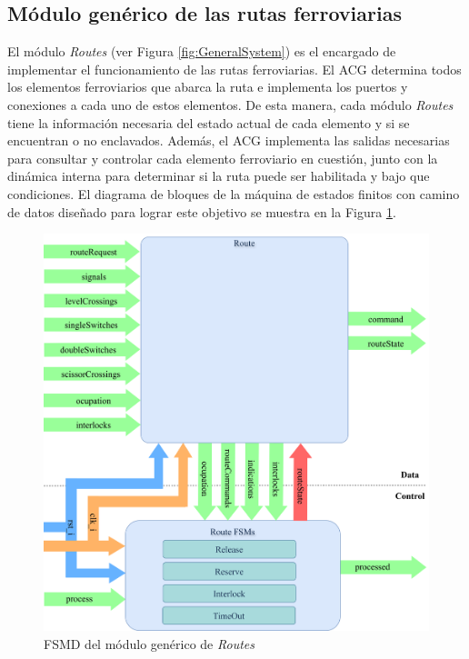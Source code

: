\subsection{Módulo genérico de las rutas ferroviarias}
	\label{sec:ACG_rts}
	
	El módulo \textit{Routes} (ver Figura \ref{fig:GeneralSystem}) es el encargado de implementar el funcionamiento de las rutas ferroviarias. El ACG determina todos los elementos ferroviarios que abarca la ruta e implementa los puertos y conexiones a cada uno de estos elementos. De esta manera, cada módulo \textit{Routes} tiene la información necesaria del estado actual de cada elemento y si se encuentran o no enclavados. Además, el ACG implementa las salidas necesarias para consultar y controlar cada elemento ferroviario en cuestión, junto con la dinámica interna para determinar si la ruta puede ser habilitada y bajo que condiciones. El diagrama de bloques de la máquina de estados finitos con camino de datos diseñado para lograr este objetivo se muestra en la Figura \ref{fig:RTS_module}.
	
	\begin{figure}[H]
		\centering
		\includegraphics[width=1\textwidth]{Figuras/RTS_module}
		\centering\caption{FSMD del módulo genérico de \textit{Routes}}
		\label{fig:RTS_module}
	\end{figure}
	
